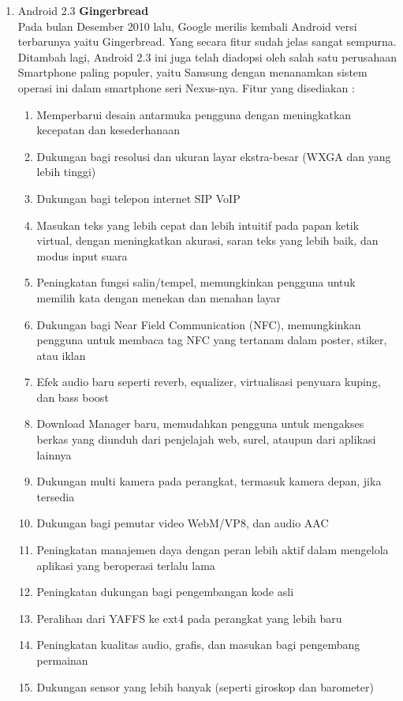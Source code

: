 \begin{enumerate}
\item Android 2.3 \textbf{Gingerbread}\\
Pada bulan Desember 2010 lalu, Google merilis kembali Android versi terbarunya yaitu Gingerbread. Yang secara fitur sudah jelas sangat sempurna. Ditambah lagi, Android 2.3 ini juga telah diadopsi oleh salah satu perusahaan Smartphone paling populer, yaitu Samsung dengan menanamkan sistem operasi ini dalam smartphone seri Nexus-nya. Fitur yang disediakan :
\begin{enumerate} 
    \item Memperbarui desain antarmuka pengguna dengan meningkatkan kecepatan dan kesederhanaan
    \item Dukungan bagi resolusi dan ukuran layar ekstra-besar (WXGA dan yang lebih tinggi)
    \item Dukungan bagi telepon internet SIP VoIP
    \item Masukan teks yang lebih cepat dan lebih intuitif pada papan ketik virtual, dengan meningkatkan akurasi, saran teks yang lebih baik, dan modus input suara
    \item Peningkatan fungsi salin/tempel, memungkinkan pengguna untuk memilih kata dengan menekan dan menahan layar
    \item Dukungan bagi Near Field Communication (NFC), memungkinkan pengguna untuk membaca tag NFC yang tertanam dalam poster, stiker, atau iklan
    \item Efek audio baru seperti reverb, equalizer, virtualisasi penyuara kuping, dan bass boost
    \item Download Manager baru, memudahkan pengguna untuk mengakses berkas yang diunduh dari penjelajah web, surel, ataupun dari aplikasi lainnya
    \item Dukungan multi kamera pada perangkat, termasuk kamera depan, jika tersedia
    \item Dukungan bagi pemutar video WebM/VP8, dan audio AAC
    \item Peningkatan manajemen daya dengan peran lebih aktif dalam mengelola aplikasi yang beroperasi terlalu lama
    \item Peningkatan dukungan bagi pengembangan kode asli
    \item Peralihan dari YAFFS ke ext4 pada perangkat yang lebih baru
    \item Peningkatan kualitas audio, grafis, dan masukan bagi pengembang permainan
    \item Dukungan sensor yang lebih banyak (seperti giroskop dan barometer)
\end{enumerate}


\end{enumerate}

